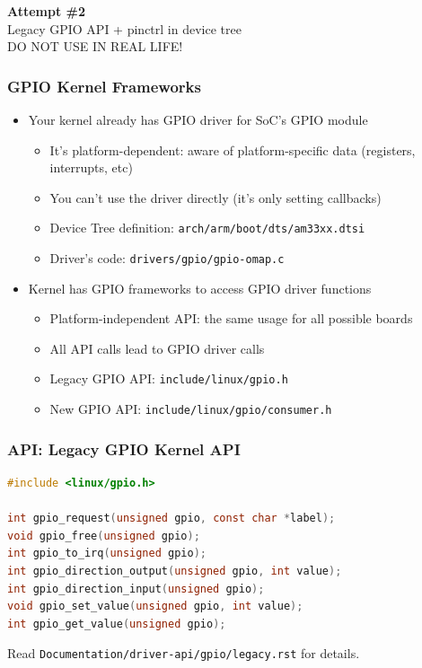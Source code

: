 \begin{frame}[standout]
  \textbf{Attempt \#2} \\
  \vspace{5mm}
  Legacy GPIO API + pinctrl in device tree \\
  \vspace{5mm}
  \alert{DO NOT USE IN REAL LIFE!}
\end{frame}

\begin{frame}
  \frametitle{GPIO Kernel Frameworks}
  \begin{itemize}
    \item Your kernel already has GPIO driver for SoC's GPIO module
      \begin{itemize}
        \item It's platform-dependent: aware of platform-specific data
              (registers, interrupts, etc)
        \item You can't use the driver directly (it's only setting callbacks)
        \item Device Tree definition: \texttt{arch/arm/boot/dts/am33xx.dtsi}
        \item Driver's code: \texttt{drivers/gpio/gpio-omap.c}
      \end{itemize}
    \pause
    \item Kernel has GPIO frameworks to access GPIO driver functions
      \begin{itemize}
        \item Platform-independent API: the same usage for all possible boards
        \item All API calls lead to GPIO driver calls
        \item Legacy GPIO API: \texttt{include/linux/gpio.h}
        \item New GPIO API: \texttt{include/linux/gpio/consumer.h}
      \end{itemize}
  \end{itemize}
\end{frame}

\begin{frame}[containsverbatim]
  \frametitle{API: Legacy GPIO Kernel API}
  \begin{lstlisting}[language=c,numbers=none]
#include <linux/gpio.h>

int gpio_request(unsigned gpio, const char *label);
void gpio_free(unsigned gpio);
int gpio_to_irq(unsigned gpio);
int gpio_direction_output(unsigned gpio, int value);
int gpio_direction_input(unsigned gpio);
void gpio_set_value(unsigned gpio, int value);
int gpio_get_value(unsigned gpio);
  \end{lstlisting}

  Read \texttt{Documentation/driver-api/gpio/legacy.rst} for details.
\end{frame}

